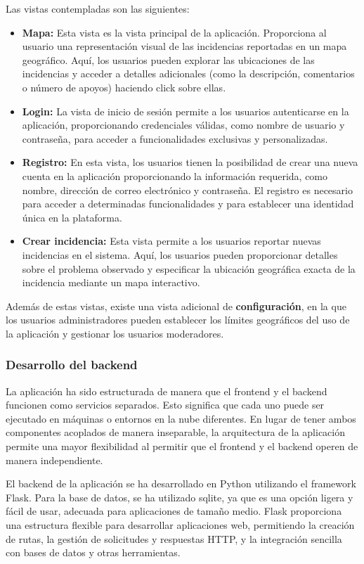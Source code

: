 \documentclass{article}
\begin{document}
Las vistas contempladas son las siguientes:

\begin{itemize}
    \item \textbf{Mapa:} Esta vista es la vista principal de la aplicación. Proporciona al usuario una representación visual de las incidencias reportadas en un mapa geográfico. Aquí, los usuarios pueden explorar las ubicaciones de las incidencias y acceder a detalles adicionales (como la descripción, comentarios o número de apoyos) haciendo click sobre ellas. 
    \item \textbf{Login:} La vista de inicio de sesión permite a los usuarios autenticarse en la aplicación, proporcionando credenciales válidas, como nombre de usuario y contraseña, para acceder a funcionalidades exclusivas y personalizadas.
    \item \textbf{Registro:} En esta vista, los usuarios tienen la posibilidad de crear una nueva cuenta en la aplicación proporcionando la información requerida, como nombre, dirección de correo electrónico y contraseña. El registro es necesario para acceder a determinadas funcionalidades y para establecer una identidad única en la plataforma.
    \item \textbf{Crear incidencia:} Esta vista permite a los usuarios reportar nuevas incidencias en el sistema. Aquí, los usuarios pueden proporcionar detalles sobre el problema observado y especificar la ubicación geográfica exacta de la incidencia mediante un mapa interactivo.
\end{itemize}

Además de estas vistas, existe una vista adicional de \textbf{configuración}, en la que los usuarios administradores pueden establecer los límites geográficos del uso de la aplicación y gestionar los usuarios moderadores.

\subsubsection{Desarrollo del backend}

La aplicación ha sido estructurada de manera que el frontend y el backend funcionen como servicios separados. Esto significa que cada uno puede ser ejecutado en máquinas o entornos en la nube diferentes. En lugar de tener ambos componentes acoplados de manera inseparable, la arquitectura de la aplicación permite una mayor flexibilidad al permitir que el frontend y el backend operen de manera independiente.

El backend de la aplicación se ha desarrollado en Python utilizando el framework Flask. Para la base de datos, se ha utilizado sqlite, ya que es una opción ligera y fácil de usar, adecuada para aplicaciones de tamaño medio. Flask proporciona una estructura flexible para desarrollar aplicaciones web, permitiendo la creación de rutas, la gestión de solicitudes y respuestas HTTP, y la integración sencilla con bases de datos y otras herramientas.
\end{document}
